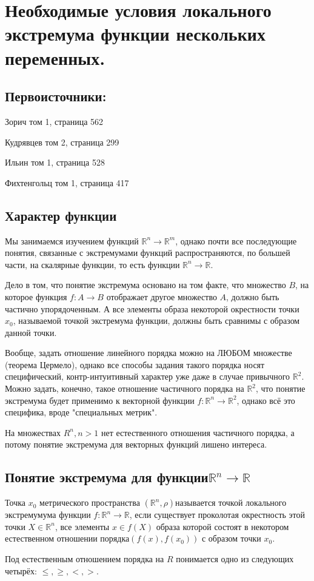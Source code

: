 \newtheorem{consequence}{Следствие}[section]
\section{Необходимые условия локального экстремума функции нескольких переменных.}
\subsection{Первоисточники:}
\parindent=0cm
Зорич том 1, страница 562

Кудрявцев том 2, страница 299

Ильин том 1, страница 528

Фихтенгольц том 1, страница 417

\subsection{Характер функции}
\parindent=1cm
Мы занимаемся изучением функций $\mathbb{R}^n \to \mathbb{R}^m$, однако почти все последующие понятия, связанные с экстремумами функций распространяются, по большей части, на скалярные функции, то есть функции $\mathbb{R}^n \to \mathbb{R}$.

Дело в том, что понятие экстремума основано на том факте, что множество $B$, на которое функция $f: A \to B$ отображает другое множество $A$, должно быть частично упорядоченным. А все элементы образа некоторой окрестности точки $x_0$, называемой точкой экстремума функции, должны быть сравнимы с образом данной точки.

Вообще, задать отношение линейного порядка можно на ЛЮБОМ множестве (теорема Цермело), однако все способы задания такого порядка носят специфический, контр-интуитивный характер уже даже в случае привычного $\mathbb{R}^2$. Можно задать, конечно, такое отношение частичного порядка на $\mathbb{R}^2$, что понятие экстремума будет применимо к векторной функции $f: \mathbb{R}^n \to \mathbb{R}^2$, однако всё это специфика, вроде "специальных метрик". 

На множествах $R^n, n>1$ нет естественного отношения частичного порядка, а потому понятие экстремума для векторных функций лишено интереса.
\subsection{Понятие экстремума для функции\linebreak $\mathbb{R}^n \to \mathbb{R}$}
\begin{definition}
Точка $x_0$ метрического пространства $(\mathbb{R}^n, \rho)$\linebreak называется точкой локального экстремумума функции $f: \mathbb{R}^n \to \mathbb{R}$, если существует проколотая окрестность этой точки $X \in \mathbb{R}^n$, все элементы $x \in f(X)$ образа которой состоят в некотором естественном отношении порядка\linebreak $(f(x), f(x_0))$ с образом точки $x_0$.

Под естественным отношением порядка на $R$ понимается одно из следующих четырёх: $\leq, \geq, <, >$.
\end{definition}

